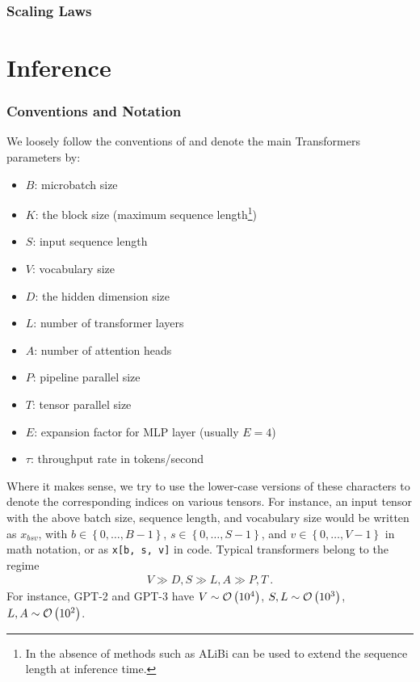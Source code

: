 \documentclass[11pt]{article}
\begin{document}
\section{Scaling Laws}

\part{Inference}







\appendix


\section{Conventions and Notation}\label{app_conventions}


We loosely follow the conventions of \cite{korthikanti2022reducing} and denote the main Transformers
parameters by:
\begin{itemize}
\item $ B $: microbatch size
\item $ K $: the block size (maximum sequence length\footnote{In the absence of methods such as
    ALiBi \cite{ALiBi}  can be used to extend the sequence length at inference time.})
\item $ S $: input sequence length
\item $ V $: vocabulary size
\item $ D $: the hidden dimension size
\item $ L $: number of transformer layers
\item $ A $: number of attention heads
\item $ P $: pipeline parallel size
\item $ T $: tensor parallel size
\item $ E $: expansion factor for MLP layer (usually $ E=4 $)
\item $ \tau $: throughput rate in tokens/second
\end{itemize}
Where it makes sense, we try to use the lower-case versions of these characters to denote the
corresponding indices on various tensors. For instance, an input tensor with the above batch size,
sequence length, and vocabulary size would be written as $ x _{ bsv } $, with $ b \in \left \{ 0,
\ldots, B - 1 \right \} $, $ s \in \left \{ 0, \ldots, S - 1\right \} $, and $  v \in \left \{ 0,
    \ldots, V -1\right \}$ in math notation, or as \texttt{x[b, s, v]} in code.  Typical
    transformers belong to the regime
\begin{gather}
V \gg D, S \gg L, A \gg P, T \ .  \label{app_eq_transformers_approxs}
\end{gather}
For instance, GPT-2 and GPT-3 \cite{gpt2radford2019language, gpt3brown2020language} have $ V \sim \mathcal{O} \left( 10 ^{ 4 } \right)  $,
$ S, L \sim \mathcal{O} \left( 10 ^{ 3 } \right)  $, $ L, A \sim \mathcal{O} \left( 10 ^{ 2 } \right)  $.
\end{document}
